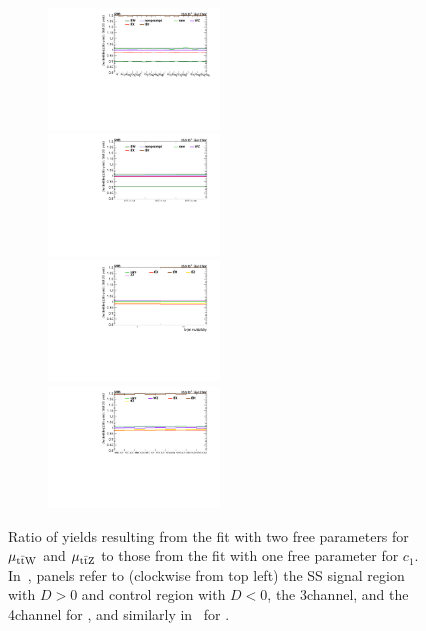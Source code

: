 \begin{figure}
\begin{subfigure}{\linewidth}
    \includegraphics[width=0.5\textwidth]{figures/thirteen-TeV/postfit/ratio_2l_tc3G}%
    \includegraphics[width=0.5\textwidth]{figures/thirteen-TeV/postfit/ratio_2l-cr_tc3G}
    \includegraphics[width=0.5\textwidth]{figures/thirteen-TeV/postfit/ratio_4l_tc3G}%
    \includegraphics[width=0.5\textwidth]{figures/thirteen-TeV/postfit/ratio_3l_tc3G}
    \caption{}
    \label{sfig:ratio-tc3G}
  \end{subfigure}
  \caption[Ratio of two and one-dimensional fit yields for \cthreeG and \cthreeG (\thirteenTeV)]{Ratio of yields resulting from the fit with two free parameters for $\mu_{\text{t}\bar{\text{t}}\text{W}}$ and $\mu_{\text{t}\bar{\text{t}}\text{Z}}$ to those from the fit with one free parameter for $c_1$. In~, panels refer to (clockwise from top left) the SS \ttW signal region with $D > 0$ and control region with $D < 0$, the 3\lep \ttZ channel, and the 4\lep \ttZ channel for \cthreeG, and similarly in~ for \tcthreeG.}
  \label{fig:ratio-c3G-tc3G}
\end{figure}
